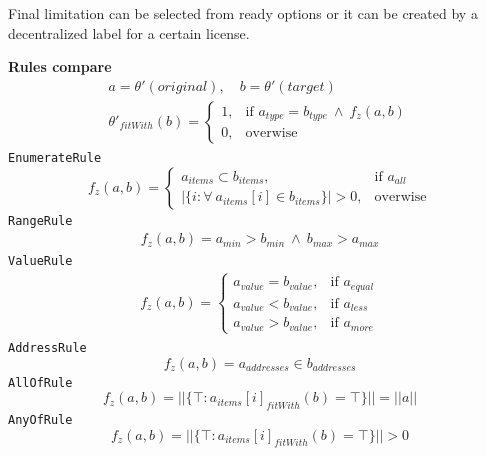 \documentclass[12pt]{report}
\def\code#1{\colorbox{light-gray}{\texttt{#1}}}
\begin{document}
Final limitation can be selected from ready options or it can be created by a decentralized label for a certain license.

\textbf{Rules compare}
\begin{equation}
\begin{aligned}
a = \theta'(original), \quad b = \theta'(target) \\
\theta'_{fitWith}(b) = \begin{cases}
	1, & \text{if } a_{type} = b_{type} \ \wedge \ f_z(a, b) \\
	0, & \text{overwise}
\end{cases}
\end{aligned}
\end{equation}
\code{EnumerateRule}
\begin{equation}
f_z(a, b) = \begin{cases}
	a_{items} \subset b_{items}, & \text{if } a_{all} \\
	|\{i: \forall \ a_{items}[i] \in b_{items}\}|> 0, & \text{overwise}
\end{cases}
\end{equation}
\code{RangeRule}
\begin{equation}
\begin{aligned}
f_z(a, b) = a_{min} > b_{min} \ \wedge \ b_{max} > a_{max}
\end{aligned}
\end{equation}
\code{ValueRule}
\begin{equation}
\begin{aligned}
f_z(a, b) = \begin{cases}
	a_{value} = b_{value}, & \text{if } a_{equal} \\
	a_{value} < b_{value}, & \text{if } a_{less} \\
	a_{value} > b_{value}, & \text{if } a_{more}
\end{cases}
\end{aligned}
\end{equation}
\code{AddressRule}
\begin{equation}
f_z(a, b) = a_{addresses} \in b_{addresses}
\end{equation}
\code{AllOfRule}
\begin{equation}
f_z(a, b) = ||\{\top: a_{items}[i]_{fitWith}(b) = \top\}|| = ||a||
\end{equation}
\code{AnyOfRule}
\begin{equation}
f_z(a, b) = ||\{\top: a_{items}[i]_{fitWith}(b) = \top\}|| > 0
\end{equation}
\end{document}
